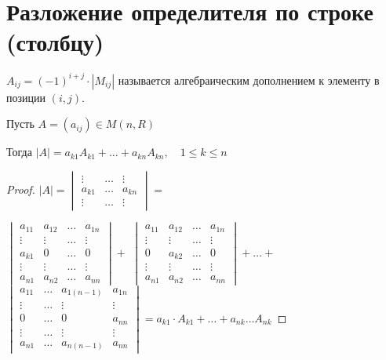 \section{Разложение определителя по строке (столбцу)}

\begin{conj}
    $A_{ij} = (-1)^{i+j} \cdot |M_{ij}|$ называется алгебраическим
    дополнением к элементу в позиции $(i, j)$.
\end{conj}

\begin{theorem-non}
    Пусть $A = (a_{ij}) \in M(n, R)$

    Тогда $|A| = a_{k1}A_{k1} + \dots + a_{kn}A_{kn},\quad 1 \leqslant k \leqslant n$

    \begin{proof}
        $|A| =
        \begin{vmatrix}
            \vdots & \dots & \vdots \\
            a_{k1} & \dots & a_{kn} \\
            \vdots & \dots & \vdots
        \end{vmatrix} =$ 

        $\begin{vmatrix}
            a_{11} & a_{12} & \dots & a_{1n} \\
            \vdots & \vdots & \dots & \vdots \\
            a_{k1} & 0 & \dots & 0 \\
            \vdots & \vdots & \dots & \vdots \\
            a_{n1} & a_{n2} & \dots & a_{nn}
        \end{vmatrix} + $
        $\begin{vmatrix}
            a_{11} & a_{12} & \dots & a_{1n} \\
            \vdots & \vdots & \dots & \vdots \\
            0 & a_{k2} & \dots & 0 \\
            \vdots & \vdots & \dots & \vdots \\
            a_{n1} & a_{n2} & \dots & a_{nn}
        \end{vmatrix} + \dots + $
        $\begin{vmatrix}
            a_{11} & \dots & a_{1(n-1)} & a_{1n} \\
            \vdots & \dots & \vdots & \vdots \\
            0 & \dots & 0 & a_{nn} \\
            \vdots & \dots & \vdots & \vdots \\
            a_{n1} & \dots & a_{n(n-1)} & a_{nn}
        \end{vmatrix} = a_{k1}\cdot A_{k1} + \dots + a_{nk} \dots A_{nk}$
    \end{proof}
\end{theorem-non}

